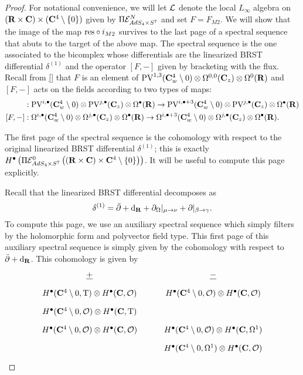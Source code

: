 \documentclass[../main.tex]{subfiles}
\begin{document}
\begin{proof}
For notational convenience, we will let $\mathcal{L}$ denote the local $L_\infty$ algebra on  $(\mathbf{R}\times \mathbf{C}) \times (\mathbf{C}^4\setminus \{0\} )$ given by $\Pi\mathcal{E}^N_{AdS_4\times S^7}$ and set $F = F_{M2}$. We will show that the image of the map $\mathrm{res}\circ i_{M2}$ survives to the last page of a spectral sequence that abuts to the target of the above map. The spectral sequence is the one associated to the bicomplex whose differentials are the linearized BRST differential $\delta^{(1)}$ and the operator $[F,- ]$ given by bracketing with the flux. Recall from \ref{} that $F$ is an element of  $\text{PV}^{1,3}(\mathbf{C}_w^4 \setminus 0) \otimes \Omega^{0,0}(\mathbf{C}_z) \otimes \Omega^0(\mathbf{R})$ and $[F,-]$ acts on the fields according to two types of maps:
\begin{align*}
[F ,-] & : \PV^{i,\bullet}(\C^4_w \setminus 0) \otimes \PV^{j,\bullet} (\C_z) \otimes \Omega^\bullet (\R) \to \PV^{i,\bullet+3}(\C^4_w \setminus 0) \otimes \PV^{j,\bullet} (\C_z) \otimes \Omega^\bullet (\R) \\
[F,-] & : \Omega^{i,\bullet}(\C^4_w \setminus 0) \otimes \Omega^{j,\bullet} (\C_z) \otimes \Omega^\bullet (\R) \to \Omega^{i,\bullet+3}(\C^4_w \setminus 0) \otimes \Omega^{j,\bullet} (\C_z) \otimes \Omega^\bullet (\R).
\end{align*}

The first page of the spectral sequence is the cohomology with respect to the original linearized BRST differential $\delta^{(1)}$; this is exactly $H^\bullet \left ( \Pi \mathcal{E}^0_{AdS_4\times S^7} \left ( (\mathbf{R}\times \mathbf{C}) \times \mathbf{C}^4\setminus \{0\} \right ) \right )$. It will be useful to compute this page explicitly.

Recall that the linearized BRST differential decomposes as
\[
\delta^{(1)} = \bar{\partial} + \mathrm{d}_{\mathbf{R}} + \partial_{\Omega} |_{\mu \to \nu} + \partial |_{\beta \to \gamma}  .
\]
To compute this page, we use an auxiliary spectral sequence which simply filters by the holomorphic form and polyvector field type. 
This first page of this auxiliary spectral sequence is simply given by the cohomology with respect to $\bar{\partial} + \mathrm{d}_{\mathbf{R}}$. 
This cohomology is given by
\begin{equation}
  \label{eqn:ads4ss} 
  \begin{tikzcd}[row sep = 1 ex]
    \ul{+} & \ul{-} \\
H^\bullet(\C^4\setminus 0, \T) \otimes H^\bullet(\C, \mc{O}) & H^\bullet(\C^4 \setminus 0, \mc{O}) \otimes H^\bullet(\C, \mc{O}) \\
H^\bullet(\C^4\setminus 0, \mc{O}) \otimes H^\bullet(\C, \T) \\
H^\bullet(\C^4\setminus 0, \mc{O}) \otimes H^\bullet(\C, \mc{O}) & H^\bullet(\C^4\setminus 0, \mc{O}) \otimes H^\bullet(\C, \Omega^1) \\ & H^\bullet(\C^4\setminus 0, \Omega^1) \otimes H^\bullet(\C, \mc{O})  
\end{tikzcd}
\end{equation}


\end{proof}
\end{document}
